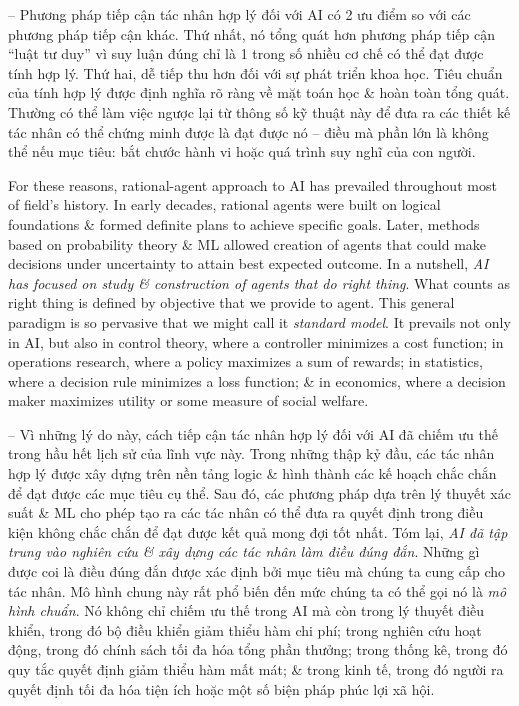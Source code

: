 \documentclass{article}
\begin{document}
\begin{itemize}
\begin{itemize}
\begin{itemize}
\begin{itemize}
				-- Phương pháp tiếp cận tác nhân hợp lý đối với AI có 2 ưu điểm so với các phương pháp tiếp cận khác. Thứ nhất, nó tổng quát hơn phương pháp tiếp cận ``luật tư duy'' vì suy luận đúng chỉ là 1 trong số nhiều cơ chế có thể đạt được tính hợp lý. Thứ hai, dễ tiếp thu hơn đối với sự phát triển khoa học. Tiêu chuẩn của tính hợp lý được định nghĩa rõ ràng về mặt toán học \& hoàn toàn tổng quát. Thường có thể làm việc ngược lại từ thông số kỹ thuật này để đưa ra các thiết kế tác nhân có thể chứng minh được là đạt được nó -- điều mà phần lớn là không thể nếu mục tiêu: bắt chước hành vi hoặc quá trình suy nghĩ của con người.
				
				For these reasons, rational-agent approach to AI has prevailed throughout most of field's history. In early decades, rational agents were built on logical foundations \& formed definite plans to achieve specific goals. Later, methods based on probability theory \& ML allowed creation of agents that could make decisions under uncertainty to attain best expected outcome. In a nutshell, {\it AI has focused on study \& construction of agents that do right thing}. What counts as right thing is defined by objective that we provide to agent. This general paradigm is so pervasive that we might call it {\it standard model}. It prevails not only in AI, but also in control theory, where a controller minimizes a cost function; in operations research, where a policy maximizes a sum of rewards; in statistics, where a decision rule minimizes a loss function; \& in economics, where a decision maker maximizes utility or some measure of social welfare.
				
				-- Vì những lý do này, cách tiếp cận tác nhân hợp lý đối với AI đã chiếm ưu thế trong hầu hết lịch sử của lĩnh vực này. Trong những thập kỷ đầu, các tác nhân hợp lý được xây dựng trên nền tảng logic \& hình thành các kế hoạch chắc chắn để đạt được các mục tiêu cụ thể. Sau đó, các phương pháp dựa trên lý thuyết xác suất \& ML cho phép tạo ra các tác nhân có thể đưa ra quyết định trong điều kiện không chắc chắn để đạt được kết quả mong đợi tốt nhất. Tóm lại, {\it AI đã tập trung vào nghiên cứu \& xây dựng các tác nhân làm điều đúng đắn}. Những gì được coi là điều đúng đắn được xác định bởi mục tiêu mà chúng ta cung cấp cho tác nhân. Mô hình chung này rất phổ biến đến mức chúng ta có thể gọi nó là {\it mô hình chuẩn}. Nó không chỉ chiếm ưu thế trong AI mà còn trong lý thuyết điều khiển, trong đó bộ điều khiển giảm thiểu hàm chi phí; trong nghiên cứu hoạt động, trong đó chính sách tối đa hóa tổng phần thưởng; trong thống kê, trong đó quy tắc quyết định giảm thiểu hàm mất mát; \& trong kinh tế, trong đó người ra quyết định tối đa hóa tiện ích hoặc một số biện pháp phúc lợi xã hội.
				

\end{itemize}
\end{itemize}
\end{itemize}
\end{itemize}
\end{document}
